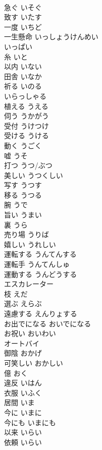 \documentclass[8pt]{extreport}
\begin{document}
\begin{CJK}{UTF8}{min}
\\	急ぐ	いそぐ	
\\	致す	いたす	
\\	一度	いちど	
\\	一生懸命	いっしょうけんめい	
\\	いっぱい		
\\	糸	いと	
\\	以内	いない	
\\	田舎	いなか	
\\	祈る	いのる	
\\	いらっしゃる		
\\	植える	うえる	
\\	伺う	うかがう	
\\	受付	うけつけ	
\\	受ける	うける	
\\	動く	うごく	
\\	嘘	うそ	
\\	打つ	うつ/ぶつ	
\\	美しい	うつくしい	
\\	写す	うつす	
\\	移る	うつる	
\\	腕	うで	
\\	旨い	うまい	
\\	裏	うら	
\\	売り場	うりば	
\\	嬉しい	うれしい	
\\	運転する	うんてんする	
\\	運転手	うんてんしゅ	
\\	運動する	うんどうする	
\\	エスカレーター		
\\	枝	えだ	
\\	選ぶ	えらぶ	
\\	遠慮する	えんりょする	
\\	お出でになる	おいでになる	
\\	お祝い	おいわい	
\\	オートバイ		
\\	御陰	おかげ	
\\	可笑しい	おかしい	
\\	億	おく	
\\	違反	いはん	
\\	衣服	いふく	
\\	居間	いま	
\\	今に	いまに	
\\	今にも	いまにも	
\\	以来	いらい	
\\	依頼	いらい	

\end{CJK}
\end{document}
